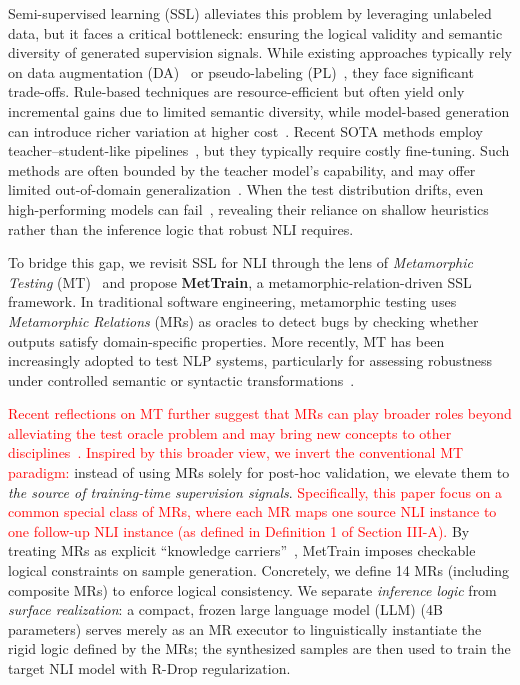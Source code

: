 \documentclass[lettersize,journal]{IEEEtran}
\newcommand{\red}[1]{\textcolor{red}{#1}}
\begin{document}
Semi-supervised learning (SSL) alleviates this problem by leveraging unlabeled data, but it faces a critical bottleneck: ensuring the logical validity and semantic diversity of generated supervision signals. While existing approaches typically rely on data augmentation (DA)~\cite{DBLP:journals/asc/PellicerFC23} or pseudo-labeling (PL)~\cite{lee2013pseudo}, they face significant trade-offs. Rule-based techniques are resource-efficient but often yield only incremental gains due to limited semantic diversity, while model-based generation can introduce richer variation at higher cost~\cite{feng-etal-2021-survey}. Recent SOTA methods employ teacher--student-like pipelines~\cite{DBLP:conf/emnlp/SadatC22a,DBLP:conf/emnlp/ParkC24}, but they typically require costly fine-tuning. Such methods are often bounded by the teacher model's capability, and may offer limited out-of-domain generalization~\cite{DBLP:journals/corr/abs-2202-07136}. When the test distribution drifts, even high-performing models can fail~\cite{mccoy-etal-2019-right, gururangan-etal-2018-annotation}, revealing their reliance on shallow heuristics rather than the inference logic that robust NLI requires.

To bridge this gap, we revisit SSL for NLI through the lens of \emph{Metamorphic Testing} (MT)~\cite{DBLP:journals/corr/abs-2002-12543} and propose \textbf{MetTrain}, a metamorphic-relation-driven SSL framework. In traditional software engineering, metamorphic testing uses \emph{Metamorphic Relations} (MRs) as oracles to detect bugs by checking whether outputs satisfy domain-specific properties. More recently, MT has been increasingly adopted to test NLP systems, particularly for assessing robustness under controlled semantic or syntactic transformations~\cite{11185922}. 

\red{Recent reflections on MT further suggest that MRs can play broader roles beyond alleviating the test oracle problem and may bring new concepts to other disciplines~\cite{DBLP:conf/sigsoft/ChenT21}. Inspired by this broader view, we invert the conventional MT paradigm: }instead of using MRs solely for post-hoc validation, we elevate them to \emph{the source of training-time supervision signals}. \red{Specifically, this paper focus on a common special class of MRs, where each MR maps one source NLI instance to one follow-up NLI instance (as defined in Definition 1 of Section III-A).} By treating MRs as explicit ``knowledge carriers''~\cite{DBLP:journals/corr/abs-2104-04718}, MetTrain imposes checkable logical constraints on sample generation. Concretely, we define 14 MRs (including composite MRs) to enforce logical consistency. We separate \emph{inference logic} from \emph{surface realization}: a compact, frozen large language model (LLM) (4B parameters) serves merely as an MR executor to linguistically instantiate the rigid logic defined by the MRs; the synthesized samples are then used to train the target NLI model with R-Drop regularization.
\end{document}
